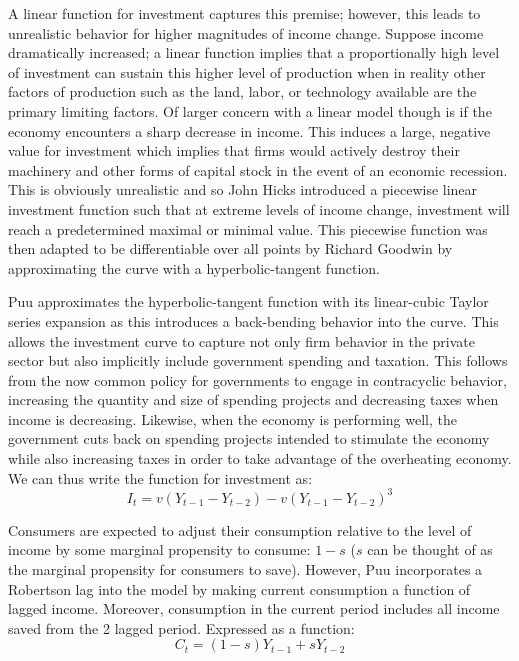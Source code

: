 A linear function for investment captures this premise; however, this leads to unrealistic behavior for higher magnitudes of income change. Suppose income dramatically increased; a linear function implies that a proportionally high level of investment can sustain this higher level of production when in reality other factors of production such as the land, labor, or technology available are the primary limiting factors. Of larger concern with a linear model though is if the economy encounters a sharp decrease in income. This induces a large, negative value for investment which implies that firms would actively destroy their machinery and other forms of capital stock in the event of an economic recession. This is obviously unrealistic and so John Hicks introduced a piecewise linear investment function such that at extreme levels of income change, investment will reach a predetermined maximal or minimal value. This piecewise function was then adapted to be differentiable over all points by Richard Goodwin by approximating the curve with a hyperbolic-tangent function\autocite{Puu2003}.

Puu approximates the hyperbolic-tangent function with its linear-cubic Taylor series expansion as this introduces a back-bending behavior into the curve. This allows the investment curve to capture not only firm behavior in the private sector but also implicitly include government spending and taxation. This follows from the now common policy for governments to engage in contracyclic behavior, increasing the quantity and size of spending projects and decreasing taxes when income is decreasing. Likewise, when the economy is performing well, the government cuts back on spending projects intended to stimulate the economy while also increasing taxes in order to take advantage of the overheating economy. We can thus write the function for investment as:
\begin{equation}
    I_t = v(Y_{t-1}-Y_{t-2})-v(Y_{t-1}-Y_{t-2})^3
\end{equation}

Consumers are expected to adjust their consumption relative to the level of income by some marginal propensity to consume: $1-s$ ($s$ can be thought of as the marginal propensity for consumers to save). However, Puu incorporates a Robertson lag into the model by making current consumption a function of lagged income. Moreover, consumption in the current period includes all income saved from the 2 lagged period. Expressed as a function:
\begin{equation}
    C_t = (1-s)Y_{t-1}+sY_{t-2}
\end{equation}

